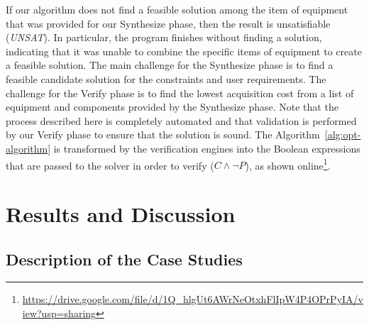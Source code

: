\documentclass[runningheads]{llncs}
\begin{document}
If our algorithm does not find a feasible solution among the item of equipment that was provided for our {\sc Synthesize} phase, then the result is unsatisfiable (\textit{UNSAT}). In particular, the program finishes without finding a solution, indicating that it was unable to combine the specific items of equipment to create a feasible solution. 
%
The main challenge for the {\sc Synthesize} phase is to find a feasible candidate solution for the constraints and user requirements. The challenge for the {\sc Verify} phase is to find the lowest acquisition cost from a list of equipment and components provided by the {\sc Synthesize} phase. 
%
Note that the process described here is completely automated and that validation is performed by our {\sc Verify} phase to ensure that the solution is sound.
The Algorithm~\ref{alg:opt-algorithm} is transformed by the verification engines into the Boolean expressions that are passed to the solver in order to verify ($C \wedge \neg P$), as shown online\footnote{\url{https://drive.google.com/file/d/1Q_hlgUt6AWrNeOtxhFlIpW4P4OPrPyIA/view?usp=sharing}}.

\section{Results and Discussion}
\subsection{Description of the Case Studies}
\end{document}
